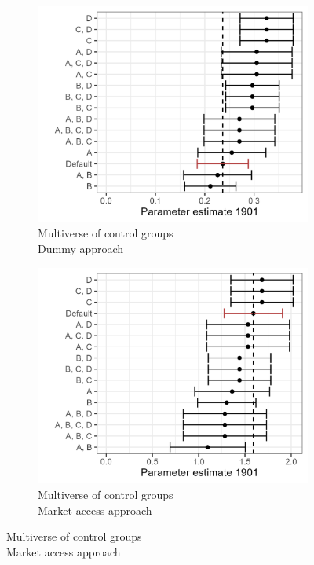 \begin{figure}[H]
    \centering
    \caption{Multiverse of the effect in different comparison groups and parameter choices, 1787}
    \begin{subfigure}[b]{0.45\textwidth}
        \centering
        \caption{Multiverse of control groups\\Dummy approach} \label{fig:mult1_1787}
        \includegraphics[width=\textwidth]{Plots/Regression_plots/Multiverse_dummy.png}
    \end{subfigure}
    \hfill
    \begin{subfigure}[b]{0.45\textwidth}
        \centering
        \caption{Multiverse of control groups\\Market access approach} \label{fig:mult2_1787}
        \includegraphics[width=\textwidth]{Plots/Regression_plots/Multiverse_MA.png}

\end{subfigure}
\end{figure}
